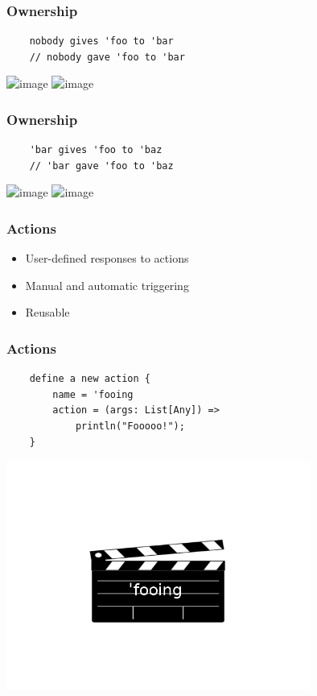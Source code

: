 \documentclass{beamer}
\begin{document}
\begin{frame}[fragile]
    \frametitle{Ownership}
    \begin{lstlisting}
    nobody gives 'foo to 'bar
    // nobody gave 'foo to 'bar
    \end{lstlisting}
    \includegraphics<1>[width=13cm]{nobody-gives1}
    \includegraphics<2>[width=13cm]{nobody-gives2}
\end{frame}

\begin{frame}[fragile]
    \frametitle{Ownership}
    \begin{lstlisting}
    'bar gives 'foo to 'baz
    // 'bar gave 'foo to 'baz
    \end{lstlisting}
    \includegraphics<1>[width=13cm]{bar-gives1}
    \includegraphics<2>[width=13cm]{bar-gives2}
\end{frame}

\begin{frame}
    \frametitle{Actions}
    \begin{itemize}[<+->]
        \item{User-defined responses to actions}
        \item{Manual and automatic triggering}
        \item{Reusable}
    \end{itemize}
\end{frame}

\begin{frame}[fragile]
    \frametitle{Actions}
    \begin{lstlisting}
    define a new action {
        name = 'fooing
        action = (args: List[Any]) =>
            println("Fooooo!");
    }
    \end{lstlisting}
    \includegraphics[width=10cm]{fooing}
\end{frame}
\end{document}
